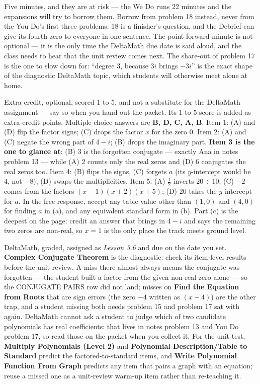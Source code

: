 \documentclass[10pt]{article}
\begin{document}
\begin{teachernote}[Debrief]
Five minutes, and they are at risk --- the We Do runs 22 minutes and the expansions will try
to borrow them. Borrow from problem 18 instead, never from the You Do's first three problems:
18 is a finisher's question, and the Debrief can give its fourth zero to everyone in one
sentence. The point-forward minute is not optional --- it is the only time the DeltaMath due
date is said aloud, and the class needs to hear that the unit review comes next. The
share-out of problem 17 is the one to slow down for: ``degree 3, because $3i$ brings $-3i$''
is the exact shape of the diagnostic DeltaMath topic, which students will otherwise meet alone
at home.
\end{teachernote}

\begin{teachernote}[AP Practice]
Extra credit, optional, scored 1 to 5, and not a substitute for the DeltaMath assignment ---
say so when you hand out the packet. Its 1-to-5 score is added as extra-credit points.
Multiple-choice answers are \textbf{B, D, C, A, B}. Item 1: (A) and (D) flip the factor signs;
(C) drops the factor $x$ for the zero 0. Item 2: (A) and (C) negate the wrong part of $4 - i$;
(B) drops the imaginary part. \textbf{Item 3 is the one to glance at}: (B) 3 is the forgotten
conjugate --- exactly Ana in notes problem 13 --- while (A) 2 counts only the real zeros and
(D) 6 conjugates the real zeros too. Item 4: (B) flips the signs, (C) forgets $a$ (its
$y$-intercept would be 4, not $-8$), (D) swaps the multiplicities. Item 5: (A) $\tfrac12$
inverts $20 \div 10$; (C) $-2$ comes from the factors $(x - 1)(x + 2)(x + 5)$; (D) 20 takes the
$y$-intercept for $a$. In the free response, accept any table value other than $(1, 0)$ and
$(4, 0)$ for finding $a$ in (a), and any equivalent standard form in (b). Part (c) is the
deepest on the page: credit an answer that brings in $4 - i$ and says the remaining two zeros
are non-real, so $x = 1$ is the only place the track meets ground level.
\end{teachernote}

\begin{teachernote}[Homework]
DeltaMath, graded, assigned as \textit{Lesson 3.6} and due on the date you set.
\textbf{Complex Conjugate Theorem} is the diagnostic: check its item-level results before the
unit review. A miss there almost always means the conjugate was forgotten --- the student
built a factor from the given non-real zero alone --- so the CONJUGATE PAIRS row did not land;
misses on \textbf{Find the Equation from Roots} that are sign errors (the zero $-4$ written as
$(x - 4)$) are the other trap, and a student missing both needs problem 15 and problem 17 sat
with again. DeltaMath cannot ask a student to judge which of two candidate polynomials has real
coefficients: that lives in notes problem 13 and You Do problem 17, so read those on the
packet when you collect it. For the unit test, \textbf{Multiply Polynomials (Level 2)} and
\textbf{Polynomial Description/Table to Standard} predict the factored-to-standard items, and
\textbf{Write Polynomial Function From Graph} predicts any item that pairs a graph with an
equation; reuse a missed one as a unit-review warm-up item rather than re-teaching it.
\end{teachernote}
\end{document}
